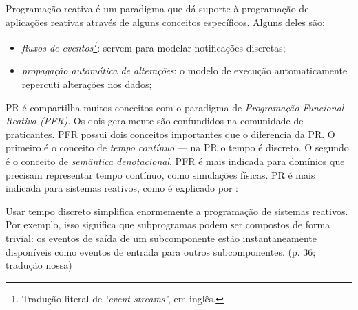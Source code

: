 Programação reativa é um paradigma que dá suporte à programação de aplicações
reativas através de alguns conceitos específicos.
Alguns deles são:

\begin{itemize}
\item \emph{fluxos de eventos\footnote{Tradução literal de \emph{‘event streams’}, em inglês.}}: servem para modelar notificações
discretas;
\item \emph{propagação automática de alterações}: o modelo de execução automaticamente
repercuti alterações nos dados;
\end{itemize}

PR é compartilha muitos conceitos com o paradigma de \emph{Programação Funcional
Reativa (PFR)}.
Os dois geralmente são confundidos na comunidade de praticantes.
PFR possui dois conceitos importantes que o diferencia da PR.
O primeiro é o conceito de \emph{tempo contínuo} — na PR o tempo é discreto.
O segundo é o conceito de \emph{semântica denotacional}.
PFR é mais indicada para domínios que precisam representar tempo contínuo,
como simulações físicas.
PR é mais indicada para sistemas reativos, como é explicado por
\textcite{roy2009}:

\begin{citacao}
  Usar tempo discreto simplifica enormemente a programação de sistemas reativos.
  Por exemplo, isso significa que subprogramas podem ser compostos de forma
  trivial: os eventos de saída de um subcomponente estão instantaneamente
  disponíveis como eventos de entrada para outros subcomponentes.
  (p. 36; tradução nossa)
\end{citacao}
